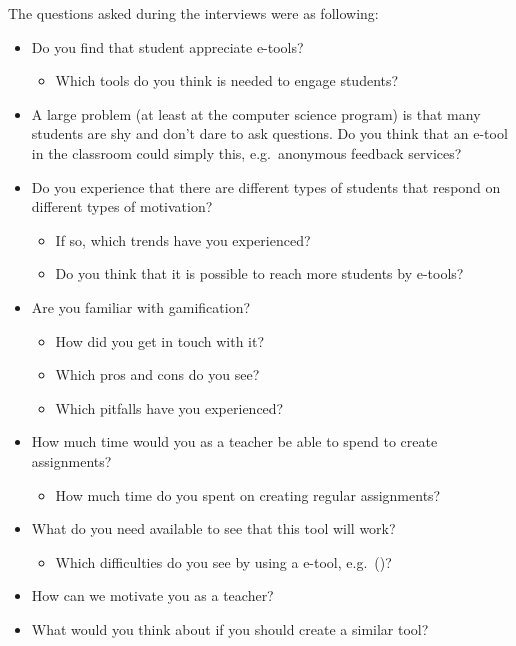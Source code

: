 The questions asked during the interviews were as following:

\begin{itemize}
 \item Do you find that student appreciate e-tools?
 \begin{itemize}
 \item Which tools do you think is needed to engage students?
 \end{itemize}
 
 \item A large problem (at least at the computer science program) is that many students are shy and don't dare to ask questions. Do you think that an e-tool in the classroom could simply this, e.g.\ anonymous feedback services? 
 
 \item Do you experience that there are different types of students that respond on different types of motivation?
 \begin{itemize}
 \item If so, which trends have you experienced?
 \item Do you think that it is possible to reach more students by e-tools?
 \end{itemize}
 
 \item Are you familiar with gamification?
 \begin{itemize}
 \item How did you get in touch with it?
 \item Which pros and cons do you see?
 \item Which pitfalls have you experienced?
 \end{itemize}
 
 \item How much time would you as a teacher be able to spend to create assignments?
 \begin{itemize}
 \item How much time do you spent on creating regular assignments?
 \end{itemize}
 
 \item What do you need available to see that this tool will work?
 \begin{itemize}
 \item Which difficulties do you see by using a e-tool, e.g.\ \techio()?
 \end{itemize}
\item How can we motivate you as a teacher?
\item What would you think about if you should create a similar tool?

\end{itemize}

